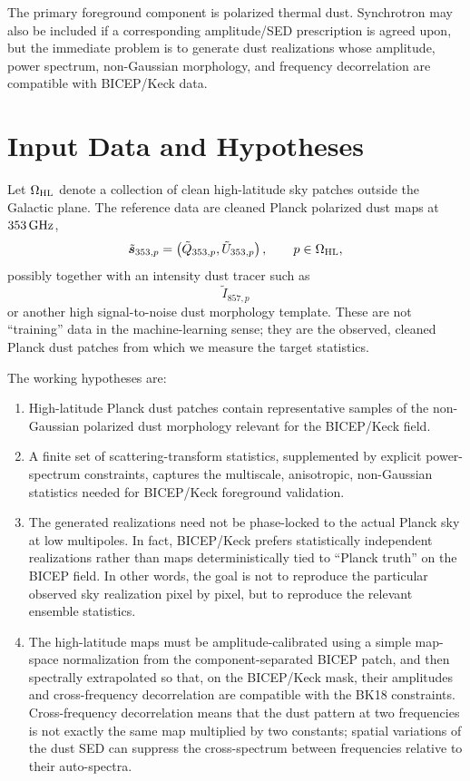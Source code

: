 \documentclass[11pt]{article}
\begin{document}
The primary foreground component is polarized thermal dust.  Synchrotron may
also be included if a corresponding amplitude/SED prescription is agreed upon,
but the immediate problem is to generate dust realizations whose amplitude,
power spectrum, non-Gaussian morphology, and frequency decorrelation are
compatible with BICEP/Keck data.

\section{Input Data and Hypotheses}

Let $\Omega_{\rm HL}$ denote a collection of clean high-latitude sky patches
outside the Galactic plane.  The reference data are cleaned Planck polarized
dust maps at $353\,{\rm GHz}$,
\[
  \tilde{\bm s}_{353,p}
  =
  \left(\tilde Q_{353,p},\tilde U_{353,p}\right),
  \qquad p\in\Omega_{\rm HL},
\]
possibly together with an intensity dust tracer such as
\[
  \tilde I_{857,p}
\]
or another high signal-to-noise dust morphology template.  These are not
``training'' data in the machine-learning sense; they are the observed,
cleaned Planck dust patches from which we measure the target statistics.

The working hypotheses are:
\begin{enumerate}[label=(H\arabic*)]
  \item High-latitude Planck dust patches contain representative samples of
  the non-Gaussian polarized dust morphology relevant for the BICEP/Keck field.

  \item A finite set of scattering-transform statistics, supplemented by
  explicit power-spectrum constraints, captures the multiscale, anisotropic,
  non-Gaussian statistics needed for BICEP/Keck foreground validation.

  \item The generated realizations need not be phase-locked to the actual
  Planck sky at low multipoles.  In fact, BICEP/Keck prefers statistically
  independent realizations rather than maps deterministically tied to
  ``Planck truth'' on the BICEP field.  In other words, the goal is not to
  reproduce the particular observed sky realization pixel by pixel, but to
  reproduce the relevant ensemble statistics.

  \item The high-latitude maps must be amplitude-calibrated using a simple
  map-space normalization from the component-separated BICEP patch, and then
  spectrally extrapolated so that, on the BICEP/Keck mask, their amplitudes
  and cross-frequency decorrelation are compatible with the BK18 constraints.
  Cross-frequency decorrelation means that the dust pattern at two frequencies
  is not exactly the same map multiplied by two constants; spatial variations
  of the dust SED can suppress the cross-spectrum between frequencies relative
  to their auto-spectra.
\end{enumerate}
\end{document}
